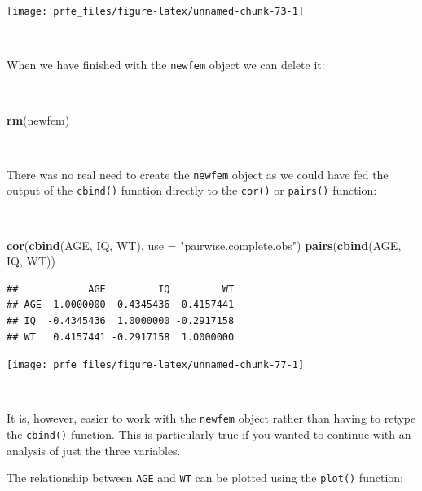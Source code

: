 \documentclass[12pt,a4paper]{book}
\newenvironment{Shaded}{\begin{snugshade}}{\end{snugshade}}
\newcommand{\KeywordTok}[1]{\textcolor[rgb]{0.13,0.29,0.53}{\textbf{#1}}}
\newcommand{\DataTypeTok}[1]{\textcolor[rgb]{0.13,0.29,0.53}{#1}}
\newcommand{\StringTok}[1]{\textcolor[rgb]{0.31,0.60,0.02}{#1}}
\newcommand{\NormalTok}[1]{#1}
\theoremstyle{definition}
\theoremstyle{definition}
\theoremstyle{definition}
\theoremstyle{remark}
\begin{document}
\newpage

\begin{center}\texttt{[image: prfe\_files/figure-latex/unnamed-chunk-73-1]} \end{center}

~

When we have finished with the \texttt{newfem} object we can delete it:

~

\begin{Shaded}
\begin{Highlighting}[]
\KeywordTok{rm}\NormalTok{(newfem)}
\end{Highlighting}
\end{Shaded}

~

There was no real need to create the \texttt{newfem} object as we could
have fed the output of the \texttt{cbind()} function directly to the
\texttt{cor()} or \texttt{pairs()} function:

~

\begin{Shaded}
\begin{Highlighting}[]
\KeywordTok{cor}\NormalTok{(}\KeywordTok{cbind}\NormalTok{(AGE, IQ, WT), }\DataTypeTok{use =} \StringTok{"pairwise.complete.obs"}\NormalTok{)}
\KeywordTok{pairs}\NormalTok{(}\KeywordTok{cbind}\NormalTok{(AGE, IQ, WT))}
\end{Highlighting}
\end{Shaded}

\begin{verbatim}
##            AGE         IQ         WT
## AGE  1.0000000 -0.4345436  0.4157441
## IQ  -0.4345436  1.0000000 -0.2917158
## WT   0.4157441 -0.2917158  1.0000000
\end{verbatim}

\newpage

\begin{center}\texttt{[image: prfe\_files/figure-latex/unnamed-chunk-77-1]} \end{center}

~

It is, however, easier to work with the \texttt{newfem} object rather
than having to retype the \texttt{cbind()} function. This is
particularly true if you wanted to continue with an analysis of just the
three variables.

The relationship between \texttt{AGE} and \texttt{WT} can be plotted
using the \texttt{plot()} function:

~
\end{document}
